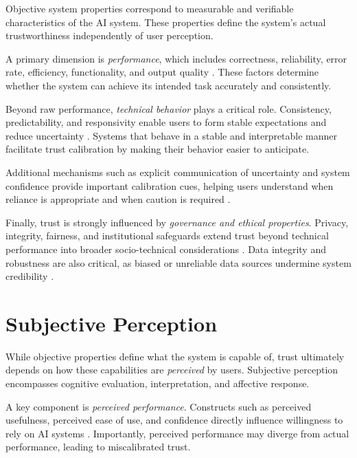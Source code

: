 \documentclass[sigconf]{acmart}
\begin{document}
Objective system properties correspond to measurable and verifiable characteristics of the AI system. These properties define the system’s actual trustworthiness independently of user perception.

A primary dimension is \emph{performance}, which includes correctness, reliability, error rate, efficiency, functionality, and output quality \cite{afroogh_trust_in_ai, Rheuetal.2020.SystematicReviewTrustBuildingFactors, hayes2017improving, schepman_general_attitude, choudhury_chat_gpt}. These factors determine whether the system can achieve its intended task accurately and consistently.

Beyond raw performance, \emph{technical behavior} plays a critical role. Consistency, predictability, and responsivity enable users to form stable expectations and reduce uncertainty \cite{yang_wibowo_2022, carsten_hmi_automated_cars, chiou_trusting_automation}. Systems that behave in a stable and interpretable manner facilitate trust calibration by making their behavior easier to anticipate.

Additional mechanisms such as explicit communication of uncertainty and system confidence provide important calibration cues, helping users understand when reliance is appropriate and when caution is required \cite{Buçinca_Proxy_tasks, haeuslschmid_SupportingTrustAutonomousDriving, okamura_yamada_2020}.

Finally, trust is strongly influenced by \emph{governance and ethical properties}. Privacy, integrity, fairness, and institutional safeguards extend trust beyond technical performance into broader socio-technical considerations \cite{aoki_chatbot_experimental, nazar_hci_xai_healthcare, habbal2024artificial, schepman_general_attitude}. Data integrity and robustness are also critical, as biased or unreliable data sources undermine system credibility \cite{wang_2019_artificial_intelligence_future_humanity, Aldoseri_et_al_2023}.

\section{Subjective Perception}

While objective properties define what the system is capable of, trust ultimately depends on how these capabilities are \emph{perceived} by users. Subjective perception encompasses cognitive evaluation, interpretation, and affective response.

A key component is \emph{perceived performance}. Constructs such as perceived usefulness, perceived ease of use, and confidence directly influence willingness to rely on AI systems \cite{zhang_automated_vehicle_acceptance, hayes2017improving, schepman_general_attitude, choudhury_chat_gpt}. Importantly, perceived performance may diverge from actual performance, leading to miscalibrated trust.
\end{document}
